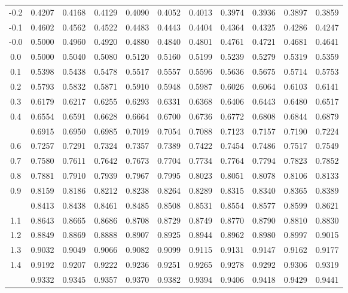 \documentclass[12pt,a4paper]{article}
\begin{document}
\begin{enumerate}
\begin{center}
\begin{longtable}{ccccccccccc}
-0.2 & 0.4207 & 0.4168 & 0.4129 & 0.4090 & 0.4052 & 0.4013 & 0.3974 & 0.3936 & 0.3897 & 0.3859 \\
-0.1 & 0.4602 & 0.4562 & 0.4522 & 0.4483 & 0.4443 & 0.4404 & 0.4364 & 0.4325 & 0.4286 & 0.4247 \\
-0.0 & 0.5000 & 0.4960 & 0.4920 & 0.4880 & 0.4840 & 0.4801 & 0.4761 & 0.4721 & 0.4681 & 0.4641 \\
\midrule
0.0 & 0.5000 & 0.5040 & 0.5080 & 0.5120 & 0.5160 & 0.5199 & 0.5239 & 0.5279 & 0.5319 & 0.5359 \\
0.1 & 0.5398 & 0.5438 & 0.5478 & 0.5517 & 0.5557 & 0.5596 & 0.5636 & 0.5675 & 0.5714 & 0.5753 \\
0.2 & 0.5793 & 0.5832 & 0.5871 & 0.5910 & 0.5948 & 0.5987 & 0.6026 & 0.6064 & 0.6103 & 0.6141 \\
0.3 & 0.6179 & 0.6217 & 0.6255 & 0.6293 & 0.6331 & 0.6368 & 0.6406 & 0.6443 & 0.6480 & 0.6517 \\
0.4 & 0.6554 & 0.6591 & 0.6628 & 0.6664 & 0.6700 & 0.6736 & 0.6772 & 0.6808 & 0.6844 & 0.6879 \\
\addlinespace
0.5 & 0.6915 & 0.6950 & 0.6985 & 0.7019 & 0.7054 & 0.7088 & 0.7123 & 0.7157 & 0.7190 & 0.7224 \\
0.6 & 0.7257 & 0.7291 & 0.7324 & 0.7357 & 0.7389 & 0.7422 & 0.7454 & 0.7486 & 0.7517 & 0.7549 \\
0.7 & 0.7580 & 0.7611 & 0.7642 & 0.7673 & 0.7704 & 0.7734 & 0.7764 & 0.7794 & 0.7823 & 0.7852 \\
0.8 & 0.7881 & 0.7910 & 0.7939 & 0.7967 & 0.7995 & 0.8023 & 0.8051 & 0.8078 & 0.8106 & 0.8133 \\
0.9 & 0.8159 & 0.8186 & 0.8212 & 0.8238 & 0.8264 & 0.8289 & 0.8315 & 0.8340 & 0.8365 & 0.8389 \\
\addlinespace
1.0 & 0.8413 & 0.8438 & 0.8461 & 0.8485 & 0.8508 & 0.8531 & 0.8554 & 0.8577 & 0.8599 & 0.8621 \\
1.1 & 0.8643 & 0.8665 & 0.8686 & 0.8708 & 0.8729 & 0.8749 & 0.8770 & 0.8790 & 0.8810 & 0.8830 \\
1.2 & 0.8849 & 0.8869 & 0.8888 & 0.8907 & 0.8925 & 0.8944 & 0.8962 & 0.8980 & 0.8997 & 0.9015 \\
1.3 & 0.9032 & 0.9049 & 0.9066 & 0.9082 & 0.9099 & 0.9115 & 0.9131 & 0.9147 & 0.9162 & 0.9177 \\
1.4 & 0.9192 & 0.9207 & 0.9222 & 0.9236 & 0.9251 & 0.9265 & 0.9278 & 0.9292 & 0.9306 & 0.9319 \\
\addlinespace
1.5 & 0.9332 & 0.9345 & 0.9357 & 0.9370 & 0.9382 & 0.9394 & 0.9406 & 0.9418 & 0.9429 & 0.9441 \\

\end{longtable}
\end{center}
\end{enumerate}
\end{document}
